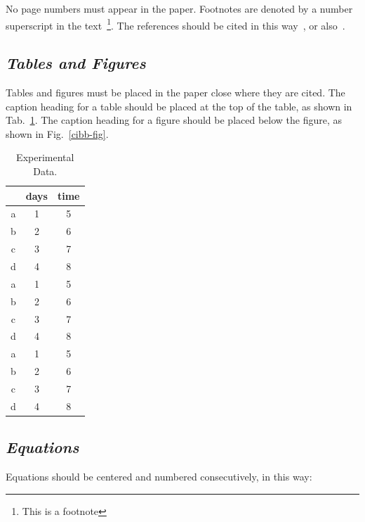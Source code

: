 \documentclass[12pt,a4paper]{cibb}
\begin{document}
No page numbers must appear in  the paper.  Footnotes are denoted by a
number  superscript in  the text~\footnote{This  is a  footnote}.  The
references   should   be   cited   in   this   way~\cite{Duda73},   or
also~\cite{Duda73,Bezdek81,Krishnapuram93,Rose90}.


\subsection{\bf \it Tables and Figures}


Tables and  figures must be placed  in the paper close  where they are
cited.  The caption heading for a table should be placed at the top of
the table,  as shown in  Tab.~\ref{data1}.  The caption heading  for a
figure   should   be   placed   below   the  figure,   as   shown   in
Fig.~\ref{cibb-fig}.

\begin{table}[t]
\vspace{3mm}
\caption{Experimental Data.\label{data1}}
\begin{center}
{\centering \small \begin{tabular}{|c|c|c|}
\hline
&
days &
time\\
\hline
\hline
a&
1&
5\\
\hline
b&
2&
6\\
\hline
c&
3&
7\\
\hline
d&
4&
8\\
\hline
a&
1&
5\\
\hline
b&
2&
6\\
\hline
c&
3&
7\\
\hline
d&
4&
8\\
\hline
a&
1&
5\\
\hline
b&
2&
6\\
\hline
c&
3&
7\\
\hline
d&
4&
8\\
\hline




\end{tabular}\par}
\end{center}
\end{table}






\subsection{\bf \it Equations}

Equations should be centered and numbered consecutively, in this way:
\end{document}
